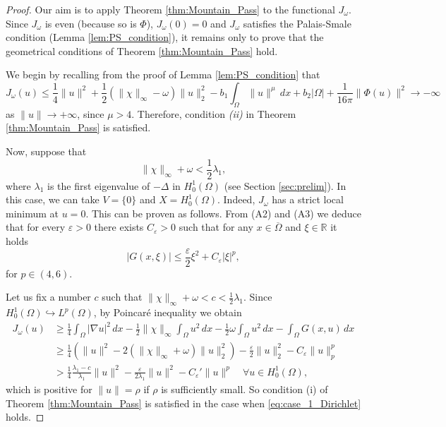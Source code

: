 \documentclass[reqno]{amsart}
\begin{document}
\begin{proof}
Our aim is to apply Theorem \ref{thm:Mountain_Pass} to the functional $J_\omega$. 
Since $J_\omega$ is even (because so is $\Phi$), $J_\omega(0) = 0$ and 
$J_\omega$ satisfies the Palais-Smale condition (Lemma \ref{lem:PS_condition}), 
it remains only to prove that the geometrical conditions of Theorem 
\ref{thm:Mountain_Pass} hold.

We begin by recalling from the proof of Lemma \ref{lem:PS_condition} that
\[
 J_\omega(u)
 \leq \frac{1}{4}\|u\|^2 + \frac{1}{2}(\|\chi\|_\infty - \omega) \|u\|_2^2 
 - b_1 \int_\Omega \|u\|^\mu \,dx + b_2 |\Omega| 
 + \frac{1}{16\pi}\|\Phi(u)\|^2  
 \to - \infty
\]
as $\|u\| \to + \infty$, since $\mu > 4$. Therefore, condition \textit{(ii)} 
in Theorem \ref{thm:Mountain_Pass} is satisfied.

Now, suppose that
\begin{equation}
 \label{eq:case_1_Dirichlet}
 \|\chi\|_\infty + \omega < \frac{1}{2} \lambda_1,
\end{equation}
where $\lambda_1$ is the first eigenvalue of $- \Delta$ in $H_0^1(\Omega)$ 
(see Section \ref{sec:prelim}). In this case, we can take $V = \{0\}$ and 
$X = H_0^1(\Omega)$. Indeed, $J_\omega$ has a strict local minimum at $u = 0$.
This can be proven as follows. From (A2) and (A3) we deduce that for every 
$\varepsilon > 0$ there exists $C_\varepsilon > 0$ such that for any 
$x \in \overline \Omega$ and $\xi \in \mathbb R$ it holds
\[
 |G(x, \xi)| \leq \frac{\varepsilon}{2} \xi^2 + C_\varepsilon |\xi|^p,
\]
for $p \in (4, 6)$.

Let us fix a number $c$ such that $\|\chi\|_\infty + \omega < c < \frac{1}{2} \lambda_1$. 
Since $H_0^1(\Omega) \hookrightarrow L^p(\Omega)$, by Poincar\'e inequality we obtain
\begin{align*}
 J_\omega(u)
 & \geq \frac{1}{4} \int_\Omega |\nabla u|^2 \,dx 
  - \frac{1}{2} \|\chi\|_\infty \int_\Omega u^2 \,dx 
  - \frac{1}{2} \omega \int_\Omega u^2 \,dx - \int_\Omega G(x, u) \,dx  \\
 & \geq \frac{1}{4}(\|u\|^2 - 2(\|\chi\|_\infty + \omega) \|u\|_2^2) 
  - \frac{\varepsilon}{2} \|u\|_2^2 - C_\varepsilon \|u\|_p^p  \\
 & > \frac{1}{4} \frac{\lambda_1 - c}{\lambda_1}\|u\|^2 
  - \frac{\varepsilon}{2 \lambda_1} \|u\|^2 
  - C_\varepsilon' \|u\|^p \quad \forall u \in H_0^1(\Omega),
\end{align*}
which is positive for $\|u\| = \rho$ if $\rho$ is sufficiently small. 
So condition (i) of Theorem \ref{thm:Mountain_Pass} is satisfied in the case 
when \eqref{eq:case_1_Dirichlet} holds.


\end{proof}
\end{document}
